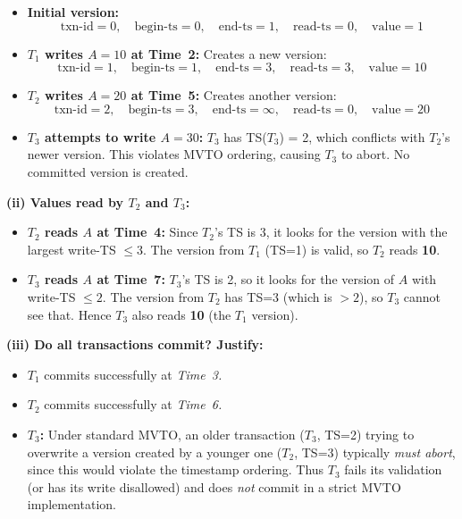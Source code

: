 \documentclass[11pt]{article}
\begin{document}
\begin{itemize}
  \item \textbf{Initial version:}
    \[
      \text{txn-id} = 0, \quad
      \text{begin-ts} = 0, \quad
      \text{end-ts} = 1, \quad
      \text{read-ts} = 0, \quad
      \text{value} = 1
    \]

  \item \textbf{$T_1$ writes $A=10$ at Time~2:}
    Creates a new version:
    \[
      \text{txn-id} = 1, \quad
      \text{begin-ts} = 1, \quad
      \text{end-ts} = 3, \quad
      \text{read-ts} = 3, \quad
      \text{value} = 10
    \]

  \item \textbf{$T_2$ writes $A=20$ at Time~5:}
    Creates another version:
    \[
      \text{txn-id} = 2, \quad
      \text{begin-ts} = 3, \quad
      \text{end-ts} = \infty, \quad
      \text{read-ts} = 0, \quad
      \text{value} = 20
    \]

  \item \textbf{$T_3$ attempts to write $A=30$:}
    $T_3$ has TS($T_3$) = 2, which conflicts with $T_2$'s newer version. This violates MVTO ordering, causing $T_3$ to abort. No committed version is created.
\end{itemize}

\noindent
\textbf{(ii) Values read by $T_2$ and $T_3$:}

\begin{itemize}
  \item \textbf{$T_2$ reads $A$ at Time~4:}
    Since $T_2$’s TS is 3, it looks for the version with the largest write-TS $\le 3.$  
    The version from $T_1$ (TS=1) is valid, so $T_2$ reads \textbf{10}.
  \item \textbf{$T_3$ reads $A$ at Time~7:}
    $T_3$’s TS is 2, so it looks for the version of $A$ with write-TS $\le 2.$  
    The version from $T_2$ has TS=3 (which is $>2$), so $T_3$ cannot see that.  
    Hence $T_3$ also reads \textbf{10} (the $T_1$ version).
\end{itemize}

\noindent
\textbf{(iii) Do all transactions commit?  Justify:}

\begin{itemize}
  \item $T_1$ commits successfully at \emph{Time~3.}
  \item $T_2$ commits successfully at \emph{Time~6.}
  \item \textbf{$T_3$:} Under standard MVTO, an older transaction ($T_3$, TS=2) trying to overwrite a version created by a younger one ($T_2$, TS=3) typically \emph{must abort}, since this would violate the timestamp ordering.  Thus $T_3$ fails its validation (or has its write disallowed) and does \emph{not} commit in a strict MVTO implementation.
\end{itemize}
\end{document}
